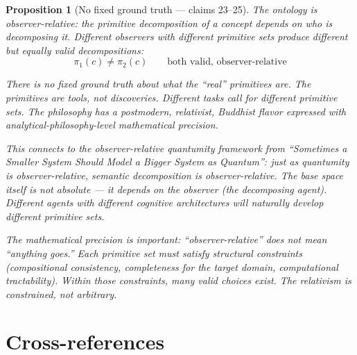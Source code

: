 \documentclass[11pt,a4paper]{article}
\newtheorem{proposition}[definition]{Proposition}
\begin{document}
\begin{proposition}[No fixed ground truth --- claims 23--25]
\label{prop:relative}
The ontology is observer-relative: the primitive decomposition of a
concept depends on who is decomposing it. Different observers with
different primitive sets produce different but equally valid
decompositions:
\[
  \pi_1(c) \neq \pi_2(c) \qquad \text{both valid, observer-relative}
\]

There is no fixed ground truth about what the ``real'' primitives are.
The primitives are tools, not discoveries. Different tasks call for
different primitive sets. The philosophy has a postmodern, relativist,
Buddhist flavor expressed with analytical-philosophy-level mathematical
precision.

This connects to the observer-relative quantumity framework from
``Sometimes a Smaller System Should Model a Bigger System as Quantum'':
just as quantumity is observer-relative, semantic decomposition is
observer-relative. The base space itself is not absolute --- it depends
on the observer (the decomposing agent). Different agents with different
cognitive architectures will naturally develop different primitive sets.

The mathematical precision is important: ``observer-relative'' does not
mean ``anything goes.'' Each primitive set must satisfy structural
constraints (compositional consistency, completeness for the target
domain, computational tractability). Within those constraints, many
valid choices exist. The relativism is constrained, not arbitrary.
\end{proposition}

\section{Cross-references}
\end{document}
